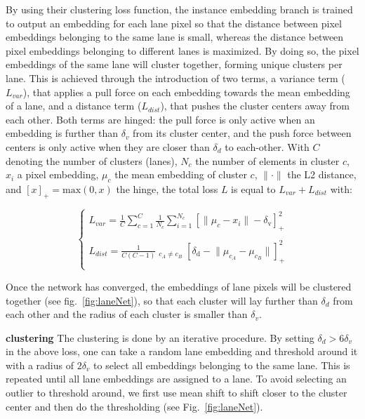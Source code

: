 \documentclass[letterpaper, 10 pt, conference]{ieeeconf}
\begin{document}
By using their clustering loss function, the instance embedding branch is trained to output an embedding for each lane pixel so that the distance between pixel embeddings belonging to the same lane is small, whereas the distance between pixel embeddings belonging to different lanes is maximized. By doing so, the pixel embeddings of the same lane will cluster together, forming unique clusters per lane. This is achieved through the introduction of two terms, a variance term ($L_{var}$), that applies a pull force on each embedding towards the mean embedding of a lane, and a distance term ($L_{dist}$), that pushes the cluster centers away from each other. Both terms are hinged: the pull force is only active when an embedding is further than $\delta_v$ from its cluster center, and the push force between centers is only active when they are closer than $\delta_d$ to each-other. With $C$ denoting the number of clusters (lanes), $N_c$ the number of elements in cluster $c$, $x_i$ a pixel embedding, $\mu_c$ the mean embedding of cluster $c$, $\lVert \cdot \rVert$ the L2 distance, and $\left[ x \right]_{+} = \textrm{max}(0,x)$ the hinge, the total loss $L$ is equal to $L_{var} + L_{dist}$ with: 

\begin{equation}
\begin{cases}
L_{var} = \frac{1}{C} \sum_{c=1}^{C} \frac{1}{N_c} \sum_{i=1}^{N_c} \left[ \lVert \mu_c - x_i \rVert - \delta_{\textrm{v}} \right]_{+}^2 \\ \\
L_{dist} = \frac{1}{C (C-1)} \mathop{\sum_{c_A = 1}^{C} \sum_{c_B = 1,}^{C}}_{c_A \neq c_B} \left[\delta_{\textrm{d}} - \lVert \mu_{c_A} - \mu_{c_B} \rVert \right]_{+}^2 \\ 
\end{cases}
\end{equation}

Once the network has converged, the embeddings of lane pixels will be clustered together (see fig.~\ref{fig:laneNet}), so that each cluster will lay further than $\delta_d$ from each other and the radius of each cluster is smaller than $\delta_v$.

\textbf{clustering} The clustering is done by an iterative procedure. By setting $\delta_d > 6 \delta_v$ in the above loss, one can take a random lane embedding and threshold around it with a radius of $2\delta_v$ to select all embeddings belonging to the same lane. This is repeated until all lane embeddings are assigned to a lane. To avoid selecting an outlier to threshold around, we first use mean shift to shift closer to the cluster center and then do the thresholding (see Fig.~\ref{fig:laneNet}). 
\end{document}
